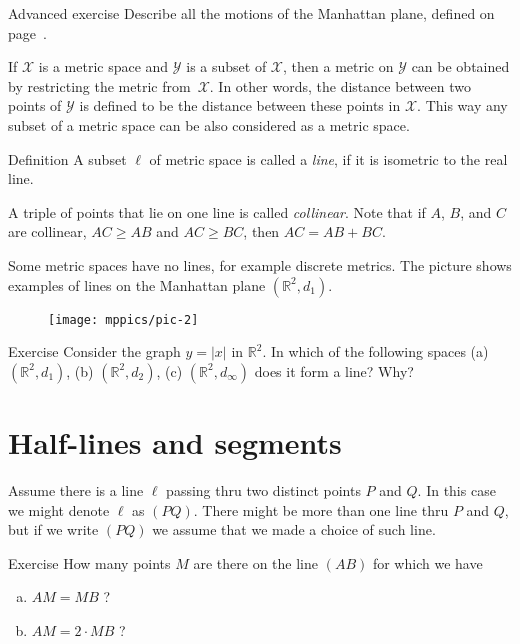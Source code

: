 \begin{thm}{Advanced exercise}\label{ad-ex:motions of Manhattan plane}
Describe all the motions of the Manhattan plane, defined on page~\pageref{Manhattan plane}.
\end{thm}

If $\mathcal X$ is a metric space and $\mathcal Y$ is a subset of $\mathcal X$,
then a metric on $\mathcal Y$ can be obtained by restricting the metric from~$\mathcal X$. 
In other words, 
the distance between two points of $\mathcal Y$ is defined to be the distance between these points in $\mathcal X$.
This way any subset of a metric space can be also considered as a metric space. 

\begin{thm}{Definition}\label{def:line}
A subset $\ell$ of metric space is called a \emph{line}, if it is isometric to the real line.
\end{thm}

A triple of points that lie on one line is called \emph{collinear}.
Note that if $A$, $B$, and  $C$ are  collinear, $AC\ge AB$ and $AC\ge BC$, then $AC= AB+BC$.

Some metric spaces have no lines, for example discrete metrics.
The picture shows examples of lines on the Manhattan plane $(\mathbb{R}^2,d_1)$. 
\begin{figure}[h!]
\centering
\texttt{[image: mppics/pic-2]}
\end{figure}

\begin{thm}{Exercise}\label{ex:y=|x|}
Consider the graph $y=|x|$ in $\mathbb{R}^2$.
In which of the following spaces 
(a) $(\mathbb{R}^2,d_1)$, 
(b) $(\mathbb{R}^2,d_2)$, 
(c) $(\mathbb{R}^2,d_\infty)$ 
does it form a line? 
Why?
\end{thm}

\section*{Half-lines and segments}

Assume there is a line $\ell$ passing thru
two distinct points $P$ and $Q$.
In this case we might denote $\ell$ as $(PQ)$.
There might be more than one line thru $P$ and $Q$,
but if we write \index{60@$(PQ)$, $[PQ)$, $[PQ]$}$(PQ)$ we assume that we made a choice of such line. 

\begin{thm}{Exercise}\label{ex:2mid}
How many points $M$ are there on the line $(A B)$ for which we have
\begin{enumerate}[(a)]
\item $AM= MB$ ?
\item $AM= 2\cdot MB$ ?
\end{enumerate}
\end{thm}

